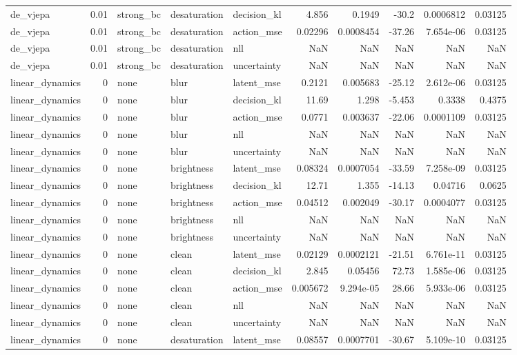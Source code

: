 \begin{tabular}{lrlllrrrrr}
de\_vjepa & 0.01 & strong\_bc & desaturation & decision\_kl & 4.856 & 0.1949 & -30.2 & 0.0006812 & 0.03125 \\
de\_vjepa & 0.01 & strong\_bc & desaturation & action\_mse & 0.02296 & 0.0008454 & -37.26 & 7.654e-06 & 0.03125 \\
de\_vjepa & 0.01 & strong\_bc & desaturation & nll & NaN & NaN & NaN & NaN & NaN \\
de\_vjepa & 0.01 & strong\_bc & desaturation & uncertainty & NaN & NaN & NaN & NaN & NaN \\
linear\_dynamics & 0 & none & blur & latent\_mse & 0.2121 & 0.005683 & -25.12 & 2.612e-06 & 0.03125 \\
linear\_dynamics & 0 & none & blur & decision\_kl & 11.69 & 1.298 & -5.453 & 0.3338 & 0.4375 \\
linear\_dynamics & 0 & none & blur & action\_mse & 0.0771 & 0.003637 & -22.06 & 0.0001109 & 0.03125 \\
linear\_dynamics & 0 & none & blur & nll & NaN & NaN & NaN & NaN & NaN \\
linear\_dynamics & 0 & none & blur & uncertainty & NaN & NaN & NaN & NaN & NaN \\
linear\_dynamics & 0 & none & brightness & latent\_mse & 0.08324 & 0.0007054 & -33.59 & 7.258e-09 & 0.03125 \\
linear\_dynamics & 0 & none & brightness & decision\_kl & 12.71 & 1.355 & -14.13 & 0.04716 & 0.0625 \\
linear\_dynamics & 0 & none & brightness & action\_mse & 0.04512 & 0.002049 & -30.17 & 0.0004077 & 0.03125 \\
linear\_dynamics & 0 & none & brightness & nll & NaN & NaN & NaN & NaN & NaN \\
linear\_dynamics & 0 & none & brightness & uncertainty & NaN & NaN & NaN & NaN & NaN \\
linear\_dynamics & 0 & none & clean & latent\_mse & 0.02129 & 0.0002121 & -21.51 & 6.761e-11 & 0.03125 \\
linear\_dynamics & 0 & none & clean & decision\_kl & 2.845 & 0.05456 & 72.73 & 1.585e-06 & 0.03125 \\
linear\_dynamics & 0 & none & clean & action\_mse & 0.005672 & 9.294e-05 & 28.66 & 5.933e-06 & 0.03125 \\
linear\_dynamics & 0 & none & clean & nll & NaN & NaN & NaN & NaN & NaN \\
linear\_dynamics & 0 & none & clean & uncertainty & NaN & NaN & NaN & NaN & NaN \\
linear\_dynamics & 0 & none & desaturation & latent\_mse & 0.08557 & 0.0007701 & -30.67 & 5.109e-10 & 0.03125 \\

\end{tabular}
